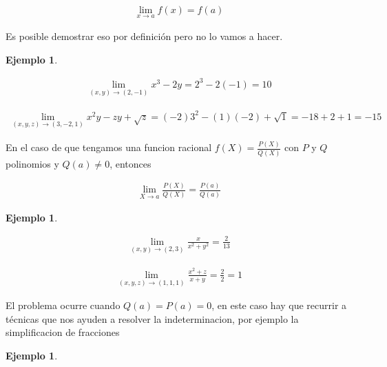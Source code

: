 \documentclass{article}
\theoremstyle{plain}
\theoremstyle{definition}
\newtheorem{ejem}[thm]{Ejemplo}
\begin{document}
\begin{align*}
\displaystyle \lim_{x \to a} f(x) = f(a)
\end{align*}

Es posible demostrar eso por definición pero no lo vamos a hacer. \\


\begin{ejem}
\end{ejem}



\begin{align*}
\displaystyle \lim_{(x,y) \to (2,-1)} x^3-2y = 2^3-2(-1) =10
\end{align*}



\begin{align*}
\displaystyle \lim_{(x,y,z) \to (3,-2,1)} x^2y-zy+\sqrt{z} = (-2)3^2-(1)(-2)+\sqrt{1} = -18+2+1=-15
\end{align*}


En el caso de que tengamos una funcion racional $f(X) = \displaystyle \frac{P(X)}{Q(X)}$ con $P$ y $Q$ polinomios y $Q(a) \neq 0$, entonces



\begin{align*}
\displaystyle \lim_{X \to a} \displaystyle \frac{P(X)}{Q(X)} = \displaystyle \frac{P(a)}{Q(a)}
\end{align*}


\begin{ejem}
\end{ejem}



\begin{align*}
\displaystyle \lim_{(x,y) \to (2,3)} \frac{x}{x^2+y^2} = \frac{2}{13}
\end{align*}



\begin{align*}
\displaystyle \lim_{(x,y,z) \to (1,1,1)} \frac{x^2+z}{x+y} = \frac{2}{2} = 1
\end{align*}



El problema ocurre cuando $Q(a) =P(a)= 0$, en este caso hay que recurrir a t\'ecnicas que nos ayuden a resolver la indeterminacion, por ejemplo la simplificacion de fracciones \\



\begin{ejem}
\end{ejem}
\end{document}
